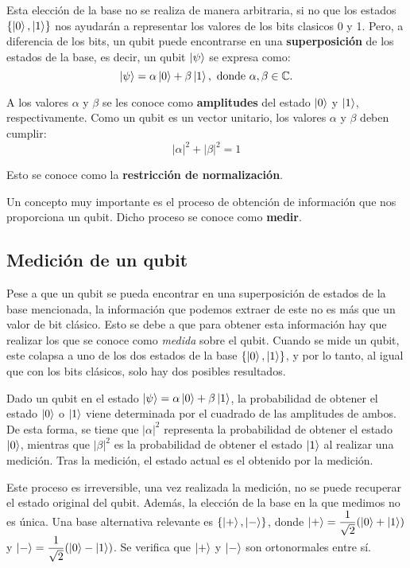 Esta elección de la base no se realiza de manera arbitraria, si no que los estados $\{\left|0\right\rangle,\left|1\right\rangle\}$ nos ayudarán a representar los valores de los bits clasicos 0 y 1. Pero, a diferencia de los bits, un qubit puede encontrarse en una \textbf{superposición} de los estados de la base, es decir, un qubit $\left|\psi\right\rangle$ se expresa como:
\begin{equation}
\ket{\psi}=\alpha\ket0+\beta\ket1,\mathrm{\ donde\ }\alpha,\beta\in\C.
\end{equation}

A los valores $\alpha$ y $\beta$ se les conoce como \textbf{amplitudes} del estado $\left|0\right\rangle$ y $\left|1\right\rangle$, respectivamente. Como un qubit es un vector unitario, los valores $\alpha$ y $\beta$ deben cumplir:
\begin{equation}
|\alpha|^2 + |\beta|^2 = 1
\end{equation}

Esto se conoce como la \textbf{restricción de normalización}.

Un concepto muy importante es el proceso de obtención de información que nos proporciona un qubit. Dicho proceso se conoce como \textbf{medir}.

\subsection{Medición de un qubit}

Pese a que un qubit se pueda encontrar en una superposición de estados de la base mencionada, la información que podemos extraer de este no es más que un valor de bit clásico. Esto se debe a que para obtener esta información hay que realizar los que se conoce como \textit{medida} sobre el qubit. Cuando se mide un qubit, este colapsa a uno de los dos estados de la base $\{\left|0\right\rangle,\left|1\right\rangle\}$, y por lo tanto, al igual que con los bits clásicos, solo hay dos posibles resultados.

Dado un qubit en el estado $\left|\psi\right\rangle=\alpha\left|0\right\rangle+\beta\left|1\right\rangle$, la probabilidad de obtener el estado $\left|0\right\rangle$ o $\left|1\right\rangle$ viene determinada por el cuadrado de las amplitudes de ambos. De esta forma, se tiene que $|\alpha|^2$ representa la probabilidad de obtener el estado $\left|0\right\rangle$, mientras que $|\beta|^2$ es la probabilidad de obtener el estado $\left|1\right\rangle$ al realizar una medición. Tras la medición, el estado actual es el obtenido por la medición.

Este proceso es irreversible, una vez realizada la medición, no se puede recuperar el estado original del qubit. Además, la elección de la base en la que medimos no es única. Una base alternativa relevante es $\{\left|+\right\rangle,\left|-\right\rangle\}$, donde $\left|+\right\rangle=\dfrac{1}{\sqrt{2}}(\left|0\right\rangle+\left|1\right\rangle)$ y $\left|-\right\rangle=\dfrac{1}{\sqrt{2}}(\left|0\right\rangle-\left|1\right\rangle)$. Se verifica que $\left|+\right\rangle$ y $\left|-\right\rangle$ son ortonormales entre sí.

